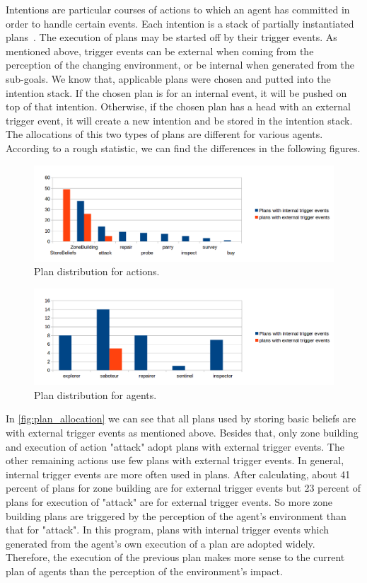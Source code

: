 Intentions are particular courses of actions to which an agent has committed in order to handle certain events. Each intention is a stack of partially instantiated plans~\cite{rafael_Javabased_2007}. The execution of plans may be started off by their trigger events. As mentioned above, trigger events can be external when coming from the perception of the changing environment, or be internal when generated from the sub-goals. We know that, applicable plans were chosen and putted into the intention stack. If the chosen plan is for an internal event, it will be pushed on top of that intention. Otherwise, if the chosen plan has a head with an external trigger event, it will create a new intention and be stored in the intention stack. The allocations of this two types of plans are different for various agents. According to a rough statistic, we can find the differences in the following figures.
\begin{figure}
  \centering
  \includegraphics[width=\textwidth]{images/BDI_plan_distribution_action}
  \caption{Plan distribution for actions.}
  \label{fig:plan_allocation}
\end{figure}
\begin{figure}
  \centering
  \includegraphics[width=\textwidth]{images/BDI_plan_distribution_role}
  \caption{Plan distribution for agents.}
  \label{fig:baselinex}
\end{figure}

In \autoref{fig:plan_allocation} we can see that all plans used by storing basic beliefs are with external trigger events as mentioned above. Besides that, only zone building and execution of action "attack" adopt plans with external trigger events. The other remaining actions use few plans with external trigger events. In general, internal trigger events are more often used in plans. After calculating, about 41 percent of plans for zone building are for external trigger events but 23 percent of plans for execution of "attack" are for external trigger events. So more zone building plans are triggered by the perception of the agent's environment than that for "attack". In this program, plans with internal trigger events which generated from the agent's own execution of a plan are adopted widely. Therefore, the execution of the previous plan makes more sense to the current plan of agents than the perception of the environment's impact.

